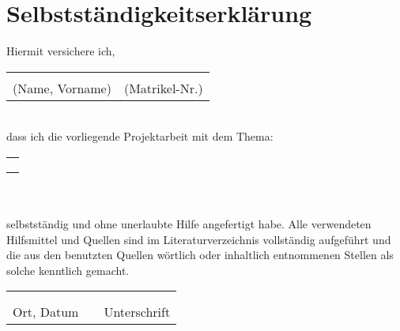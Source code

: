 \newpage

\thispagestyle{empty}
\section*{Selbstständigkeitserklärung}
\vspace{15mm}
 
Hiermit versichere ich, \\[0.5cm]
\begin{tabularx}{\textwidth}{p{8cm}p{5cm}}
\dotfill & \dotfill \\
(Name, Vorname) & (Matrikel-Nr.)
\end{tabularx} \\


dass ich die vorliegende Projektarbeit mit dem Thema:\\[0.5cm]
\begin{tabularx}{\textwidth}{X}
\dotfill \\[0.5cm]
\dotfill \\[0.5cm]
\dotfill 
\end{tabularx} \\ \\
selbstständig und ohne unerlaubte Hilfe angefertigt habe. Alle verwendeten Hilfsmittel und Quellen sind im Literaturverzeichnis vollständig aufgeführt und die aus den benutzten Quellen wörtlich oder inhaltlich entnommenen Stellen als solche kenntlich gemacht.

\vspace{2cm}

\begin{tabular}{lp{2em}l}
 \hspace{6cm} && \hspace{7cm} \\ \cline{1-1}\cline{3-3} \\
 Ort, Datum && Unterschrift
\end{tabular}